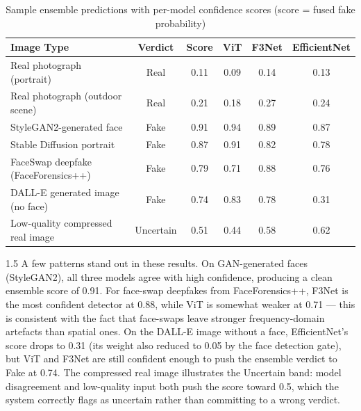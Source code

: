 \renewcommand{\arraystretch}{1.3}
\begin{table}[htbp]
  \centering
  \begin{tabular}{|p{3.2cm}|c|c|c|c|c|}
  \hline
  \textbf{Image Type} & \textbf{Verdict} & \textbf{Score} & \textbf{ViT} & \textbf{F3Net} & \textbf{EfficientNet} \\
  \hline
  Real photograph (portrait)          & Real      & 0.11 & 0.09  & 0.14  & 0.13 \\
  Real photograph (outdoor scene)     & Real      & 0.21 & 0.18  & 0.27  & 0.24 \\
  StyleGAN2-generated face            & Fake      & 0.91 & 0.94  & 0.89  & 0.87 \\
  Stable Diffusion portrait           & Fake      & 0.87 & 0.91  & 0.82  & 0.78 \\
  FaceSwap deepfake (FaceForensics++)  & Fake      & 0.79 & 0.71  & 0.88  & 0.76 \\
  DALL-E generated image (no face)    & Fake      & 0.74 & 0.83  & 0.78  & 0.31 \\
  Low-quality compressed real image   & Uncertain & 0.51 & 0.44  & 0.58  & 0.62 \\
  \hline
  \end{tabular}
  \caption{Sample ensemble predictions with per-model confidence scores (score = fused fake probability)}
  \label{tab:sample_preds}
\end{table}

\begin{spacing}{1.5}
A few patterns stand out in these results. On GAN-generated faces (StyleGAN2), all three models agree with high confidence, producing a clean ensemble score of 0.91. For face-swap deepfakes from FaceForensics++, F3Net is the most confident detector at 0.88, while ViT is somewhat weaker at 0.71 --- this is consistent with the fact that face-swaps leave stronger frequency-domain artefacts than spatial ones. On the DALL-E image without a face, EfficientNet's score drops to 0.31 (its weight also reduced to 0.05 by the face detection gate), but ViT and F3Net are still confident enough to push the ensemble verdict to Fake at 0.74. The compressed real image illustrates the Uncertain band: model disagreement and low-quality input both push the score toward 0.5, which the system correctly flags as uncertain rather than committing to a wrong verdict.
\end{spacing}

